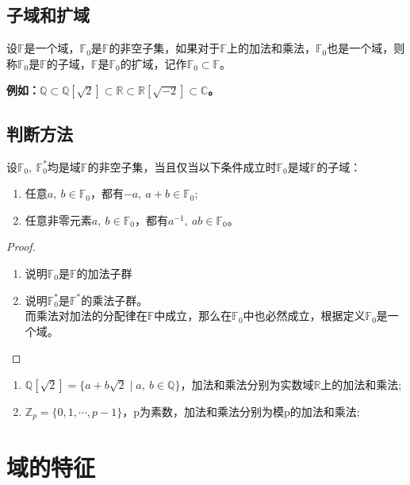 \documentclass[cn,10pt]{elegantbook}
\begin{document}
\subsection{子域和扩域}
\begin{definition}
  设$\mathbb{F}$是一个域，$\mathbb{F}_0$是$\mathbb{F}$的非空子集，如果对于$\mathbb{F}$上的加法和乘法，$\mathbb{F}_0$也是一个域，则称$\mathbb{F}_0$是$\mathbb{F}$的子域，$\mathbb{F}$是$\mathbb{F}_0$的扩域，记作$\mathbb{F}_0 \subset \mathbb{F}$。
\end{definition}
\textbf{例如：$\mathbb{Q} \subset \mathbb{Q}[\sqrt{2}] \subset \mathbb{R} \subset \mathbb{R}[\sqrt{-2}] \subset \mathbb{C}$。}
\subsection*{判断方法}
\begin{theorem}
  设$\mathbb{F}_0,\ \mathbb{F}_0^{*}$均是域$\mathbb{F}$的非空子集，当且仅当以下条件成立时$\mathbb{F}_0$是域$\mathbb{F}$的子域：
  \begin{enumerate}[(1)]
    \item 任意$a,\ b \in \mathbb{F}_0$，都有$-a,\ a+b \in \mathbb{F}_0$;
    \item 任意非零元素$a,\ b \in \mathbb{F}_0$，都有$a^{-1},\ ab \in \mathbb{F}_0$。
  \end{enumerate}
\end{theorem}
\begin{proof}
  \begin{enumerate}[(1)]
    \item 说明$\mathbb{F}_0$是$\mathbb{F}$的加法子群
    \item 说明$\mathbb{F}_0^{*}$是$\mathbb{F}^{*}$的乘法子群。\\ 而乘法对加法的分配律在$\mathbb{F}$中成立，那么在$\mathbb{F}_0$中也必然成立，根据定义$\mathbb{F}_0$是一个域。
  \end{enumerate}
\end{proof}
\begin{example}
  \begin{enumerate}[(1)]
    \item $\mathbb{Q}[\sqrt{2}]=\{a+b \sqrt{2} \mid a,\ b \in \mathbb{Q} \}$，加法和乘法分别为实数域$\mathbb{R}$上的加法和乘法;
    \item $\mathbb{Z}_p = \{0,1, \cdots , p-1 \}$，p为素数，加法和乘法分别为模p的加法和乘法;
  \end{enumerate}
\end{example}
\section{域的特征}
\end{document}
